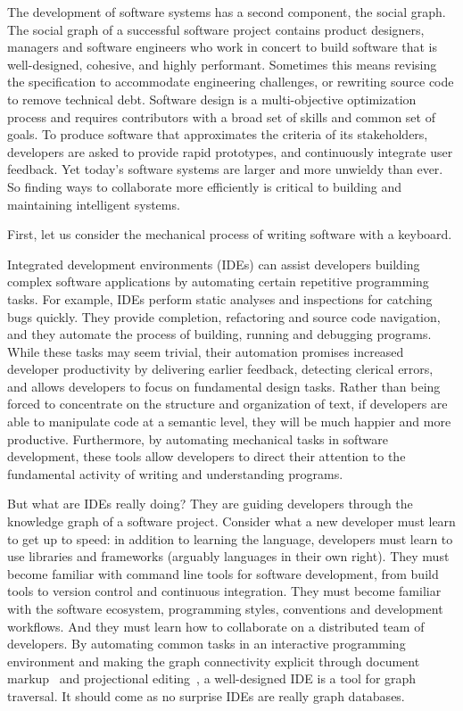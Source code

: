 \documentclass[12pt,initial,twoside,maitrise]{dms}
\numberwithin{equation}{section}
\numberwithin{table}{chapter}
\numberwithin{figure}{chapter}
\begin{document}
The development of software systems has a second component, the social graph. The social graph of a successful software project contains product designers, managers and software engineers who work in concert to build software that is well-designed, cohesive, and highly performant. Sometimes this means revising the specification to accommodate engineering challenges, or rewriting source code to remove technical debt. Software design is a multi-objective optimization process and requires contributors with a broad set of skills and common set of goals. To produce software that approximates the criteria of its stakeholders, developers are asked to provide rapid prototypes, and continuously integrate user feedback. Yet today's software systems are larger and more unwieldy than ever. So finding ways to collaborate more efficiently is critical to building and maintaining intelligent systems.

First, let us consider the mechanical process of writing software with a keyboard.

Integrated development environments (IDEs) can assist developers building complex software applications by automating certain repetitive programming tasks. For example, IDEs perform static analyses and inspections for catching bugs quickly. They provide completion, refactoring and source code navigation, and they automate the process of building, running and debugging programs. While these tasks may seem trivial, their automation promises increased developer productivity by delivering earlier feedback, detecting clerical errors, and allows developers to focus on fundamental design tasks. Rather than being forced to concentrate on the structure and organization of text, if developers are able to manipulate code at a semantic level, they will be much happier and more productive. Furthermore, by automating mechanical tasks in software development, these tools allow developers to direct their attention to the fundamental activity of writing and understanding programs.

But what are IDEs really doing? They are guiding developers through the knowledge graph of a software project. Consider what a new developer must learn to get up to speed: in addition to learning the language, developers must learn to use libraries and frameworks (arguably languages in their own right). They must become familiar with command line tools for software development, from build tools to version control and continuous integration. They must become familiar with the software ecosystem, programming styles, conventions and development workflows. And they must learn how to collaborate on a distributed team of developers. By automating common tasks in an interactive programming environment and making the graph connectivity explicit through document markup~\citep{goldfarb1981generalized} and projectional editing~\citep{voelter2014towards}, a well-designed IDE is a tool for graph traversal. It should come as no surprise IDEs are really graph databases.
\end{document}
